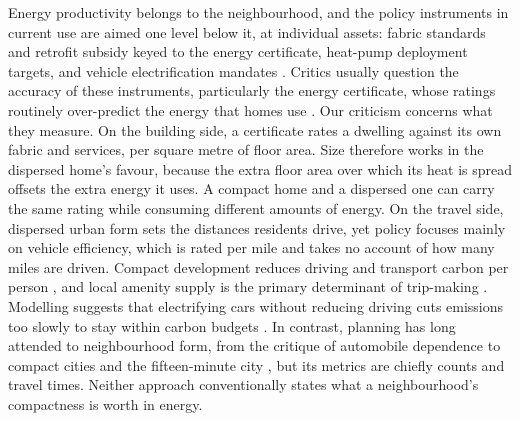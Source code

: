 \documentclass[pdflatex,sn-nature]{sn-jnl}
\begin{document}
Energy productivity belongs to the neighbourhood, and the policy instruments in current use are aimed one level below it, at individual assets: fabric standards and retrofit subsidy keyed to the energy certificate, heat-pump deployment targets, and vehicle electrification mandates \citep{ukgovernment2023,ccc2025}. Critics usually question the accuracy of these instruments, particularly the energy certificate, whose ratings routinely over-predict the energy that homes use \citep{summerfield2019,few2023,sunikka-blank2012}. Our criticism concerns what they measure. On the building side, a certificate rates a dwelling against its own fabric and services, per square metre of floor area. Size therefore works in the dispersed home's favour, because the extra floor area over which its heat is spread offsets the extra energy it uses. A compact home and a dispersed one can carry the same rating while consuming different amounts of energy. On the travel side, dispersed urban form sets the distances residents drive, yet policy focuses mainly on vehicle efficiency, which is rated per mile and takes no account of how many miles are driven. Compact development reduces driving \citep{trb2009,ewing2018} and transport carbon per person \citep{marzolla2025}, and local amenity supply is the primary determinant of trip-making \citep{abbiasov2024}. Modelling suggests that electrifying cars without reducing driving cuts emissions too slowly to stay within carbon budgets \citep{winkler2023}. In contrast, planning has long attended to neighbourhood form, from the critique of automobile dependence to compact cities and the fifteen-minute city \citep{newman1999,rode2017,moreno2021}, but its metrics are chiefly counts and travel times. Neither approach conventionally states what a neighbourhood's compactness is worth in energy.
\end{document}
